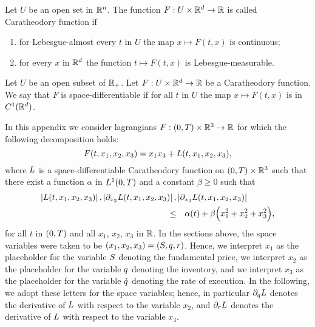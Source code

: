 \documentclass[10pt,a4paper]{article}
\begin{document}
\begin{appendices}
Let $U$ be an open set in $\mathbb{R}^{n}$. The function $F:U\times \mathbb{R}^{d} \rightarrow \mathbb{R}$ is called Caratheodory function  if
\begin{enumerate}
\item for Lebesgue-almost every $t$ in $U$ the map $x \mapsto F(t,x)$ is continuous;
\item for every $x$ in $\mathbb{R}^{d}$ the function $t\mapsto F(t,x)$ is Lebesgue-measurable. 
\end{enumerate}
\begin{defi}
Let  $U$ be an open subset of $\mathbb{R}_+$. Let $F:U\times \mathbb{R}^{d} \rightarrow \mathbb{R}$ be a  Caratheodory function. We say that $F$ is space-differentiable if for all $t$ in $U$ the map $x\mapsto F(t,x)$ is in $C^{1}(\mathbb{R}^{d})$. 
\end{defi}
In this appendix we consider lagrangians $F:(0,T)\times \mathbb{R}^{3} \rightarrow \mathbb{R}$ for which the following decomposition holds:
\begin{equation}\label{eq.abstractDecompositionOfLagrangian}
F(t,x_1,x_2,x_3) = x_1 x_3 + L (t,x_1,x_2,x_3),
\end{equation}
where $L$ is a space-differentiable Caratheodory function on $(0,T)\times \mathbb{R}^{3}$ such that  there exist a function $\alpha$ in $L^{1}(0,T)$ and a constant $\beta\geq 0$ such that 
\begin{equation}
\label{eq.growthConditionOnLarangian}
\begin{split}
\left\lvert {L(t,x_1,x_2,x_3)} \right\rvert, 
\left\lvert {\partial_{x_2}L(t,x_1,x_2,x_3)} \right\rvert, &
\left\lvert {\partial_{x_3}L(t,x_1,x_2,x_3)} \right\rvert\\
\leq & \quad  \alpha(t) + \beta\Big(x_1^{2} + x_2^{2} + x_3^{2}\Big),
\end{split}
\end{equation}
for all $t$ in $(0,T)$ and all $x_1$,  $x_2$, $x_3$ in $\mathbb{R}$. 
In the sections above, the space variables were taken to be $(x_1,x_2,x_3) = (S,q,r)$. Hence, we interpret $x_1$ as the placeholder for the variable $S$ denoting the fundamental price, we interpret $x_2$ as the placeholder for the variable $q$ denoting the inventory, and we interpret $x_3$ as the placeholder for the variable $\dot{q}$ denoting the rate of execution. In the following, we adopt these letters for the space variables; hence, in particular $\partial_q L$ denotes the derivative of $L$ with respect to the variable $x_2$, and $\partial_r L$ denotes the derivative of $L$ with respect to the variable $x_3$.


\end{appendices}
\end{document}
